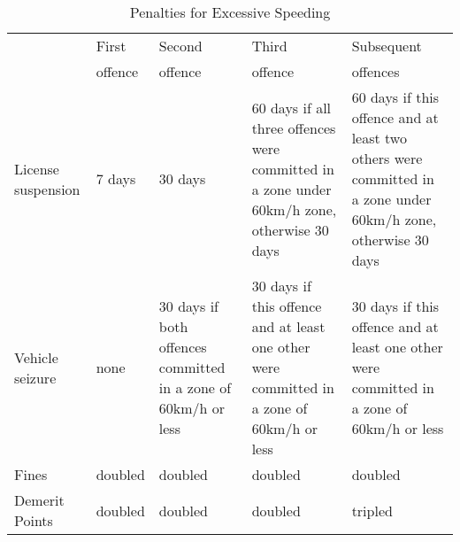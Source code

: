 
\begin{table}%
\centering
\begin{tabular}{p{1.5cm} p{1.5cm} p{2cm} p{2.5cm} p{2.5cm}}
  \hline
     				& First  	& Second	& Third 	& Subsequent  \\ 
				& offence	& offence	& offence 	& offences \\
  \hline
License suspension
	&  7 days
		& 30 days
			& 60 days if all three offences were committed in a zone under 60km/h zone, 
				otherwise 30 days
				& 60 days if this offence and at least two others were committed 
					in a zone under 60km/h zone, otherwise 30 days \\
   \hline
Vehicle seizure 
	& none
		& 30 days if both offences committed in a zone of 60km/h or less
			& 30 days if this offence and at least one other were committed 
				in a zone of 60km/h or less
				& 30 days if this offence and at least one other were committed 
					in a zone of 60km/h or less \\
   \hline
Fines			& doubled			& doubled			& doubled			& doubled \\
   \hline
Demerit Points	& doubled			& doubled			& doubled			& tripled \\
   \hline
\end{tabular}
\caption{Penalties for Excessive Speeding} 
\label{tab:penalties}
\end{table}
